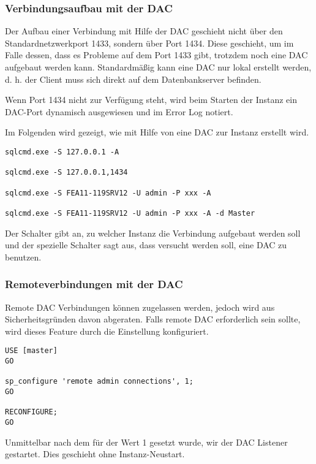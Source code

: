        \subsubsection{Verbindungsaufbau mit der DAC}
          Der Aufbau einer Verbindung mit Hilfe der DAC geschieht nicht über den
          Standardnetzwerkport 1433, sondern über Port 1434. Diese geschieht, um
          im Falle dessen, dass es Probleme auf dem Port 1433 gibt, trotzdem
          noch eine DAC aufgebaut werden kann. Standardmäßig kann eine DAC nur
          lokal erstellt werden, d. h. der Client muss sich direkt auf dem
          Datenbankserver befinden. 
          \begin{merke}
            Wenn Port 1434 nicht zur Verfügung steht, wird beim Starten der
            Instanz ein DAC-Port dynamisch ausgewiesen und im Error Log notiert.
          \end{merke}
          Im Folgenden wird gezeigt, wie mit Hilfe von 
          eine DAC zur Instanz erstellt wird.
          \begin{lstlisting}[language=terminal, caption={SQLCMD.exe mit DAC
          benutzen}, label=admin19_08]
sqlcmd.exe -S 127.0.0.1 -A

sqlcmd.exe -S 127.0.0.1,1434

sqlcmd.exe -S FEA11-119SRV12 -U admin -P xxx -A

sqlcmd.exe -S FEA11-119SRV12 -U admin -P xxx -A -d Master
        \end{lstlisting}
        Der Schalter  gibt an, zu welcher Instanz die Verbindung
        aufgebaut werden soll und der spezielle Schalter  sagt
        aus, dass versucht werden soll, eine DAC zu benutzen.
        \subsubsection{Remoteverbindungen mit der DAC}
          Remote DAC Verbindungen können zugelassen werden, jedoch wird aus
          Sicherheitsgründen davon abgeraten. Falls remote DAC erforderlich sein
          sollte, wird dieses Feature durch die Einstellung
           konfiguriert.          
           \begin{lstlisting}[language=ms_sql, caption={Konfigurieren
          von Remote DAC Verbindungen}, label=admin19_08a]
USE [master]
GO

sp_configure 'remote admin connections', 1;
GO

RECONFIGURE;
GO
        \end{lstlisting}
        Unmittelbar nach dem für  der
        Wert 1 gesetzt wurde, wir der DAC Listener gestartet. Dies
        geschieht ohne Instanz-Neustart.
        
